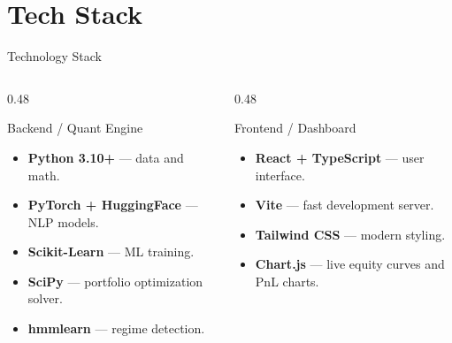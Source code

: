\documentclass[aspectratio=169, 10pt]{beamer}
\begin{document}
\section{Tech Stack}
\begin{frame}{Technology Stack}
    \begin{columns}[T]
        \begin{column}{0.48\textwidth}
            \begin{block}{Backend / Quant Engine}
                \begin{itemize}
                    \item \textbf{Python 3.10+} — data and math.
                    \item \textbf{PyTorch + HuggingFace} — NLP models.
                    \item \textbf{Scikit-Learn} — ML training.
                    \item \textbf{SciPy} — portfolio optimization solver.
                    \item \textbf{hmmlearn} — regime detection.
                \end{itemize}
            \end{block}
        \end{column}
        \begin{column}{0.48\textwidth}
            \begin{block}{Frontend / Dashboard}
                \begin{itemize}
                    \item \textbf{React + TypeScript} — user interface.
                    \item \textbf{Vite} — fast development server.
                    \item \textbf{Tailwind CSS} — modern styling.
                    \item \textbf{Chart.js} — live equity curves and PnL charts.
                \end{itemize}
            \end{block}
        \end{column}
    \end{columns}
\end{frame}

\end{document}
